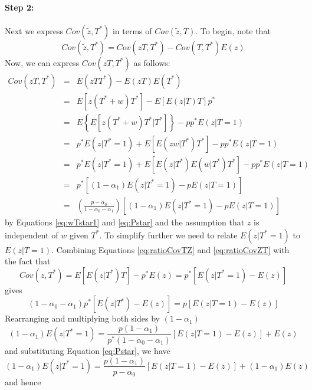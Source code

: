 \paragraph{Step 2:}
Next we express $Cov(\widetilde{z},T^*)$ in terms of $Cov(\widetilde{z},T)$. 
To begin, note that
\begin{equation*}
  Cov(\widetilde{z}, T^*) =  Cov(zT,T^*) - Cov(T,T^*)E(z)
\end{equation*}
Now, we can express $Cov(zT,T^*)$ as follows: 
\begin{eqnarray*}
  Cov(zT, T^*) &=&  E(zTT^*) - E(zT)E(T^*)\\ 
  &=& E\left[ z(T^*+w)T^* \right] - E\left[ E(z|T)T \right]p^*\\
  &=& E\left\{ E\left[z(T^*+w)T^*  |T^*\right] \right\} - pp^*E(z|T=1)\\
  &=& p^*E(z|T^*=1) + E\left[ E(zw|T^*)T^* \right]- pp^* E(z|T=1) \\
  &=& p^*E(z|T^*=1) + E\left[ E(z|T^*)E(w|T^*)T^* \right] - pp^*E(z|T=1)\\
  &=& p^*\left[ (1-\alpha_1) E(z|T^*=1) - p E(z|T=1) \right]\\
  &=& \left( \frac{p - \alpha_0}{1 - \alpha_0 - \alpha_1} \right)\left[ (1-\alpha_1) E(z|T^*=1) - p E(z|T=1) \right]
\end{eqnarray*}
by Equations \ref{eq:wTstar1} and \ref{eq:Pstar} and the assumption that $z$ is independent of $w$ given $T^*$.
To simplify further we need to relate $E(z|T^*=1)$ to $E(z|T=1)$.
Combining Equations \ref{eq:ratioCovTZ} and \ref{eq:ratioCovZT} with the fact that 
\begin{equation*}
  Cov(z,T^*) = E\left[ E(z|T^*)T \right]- p^*E(z) = p^*\left[ E(z|T^*=1) - E(z) \right]
\end{equation*}
gives
\begin{equation*}
  (1-\alpha_0 - \alpha_1)p^*\left[ E(z|T^*) - E(z) \right] = p\left[ E(z|T=1) - E(z) \right]
\end{equation*}
Rearranging and multiplying both sides by $(1-\alpha_1)$
\begin{equation*}
  (1-\alpha_1)E(z|T^*=1) = \frac{p(1-\alpha_1)}{p^*(1-\alpha_0 - \alpha_1)}\left[ E(z|T=1) - E(z) \right] + E(z)
\end{equation*}
and substituting Equation \ref{eq:Pstar}, we have
\begin{equation*}
  (1-\alpha_1)E(z|T^*=1) = \frac{p(1-\alpha_1)}{p - \alpha_0}\left[ E(z|T=1) - E(z) \right] + (1-\alpha_1)E(z)
\end{equation*}
and hence
